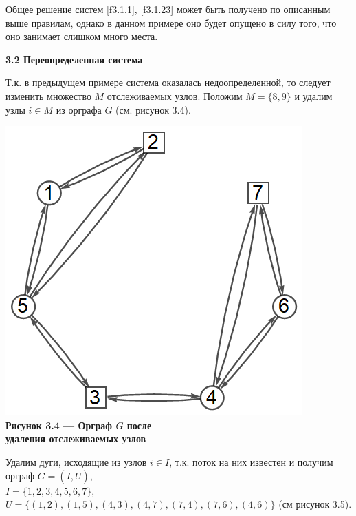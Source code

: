 \documentclass[14pt]{extarticle}%
\begin{document}
Общее решение систем \eqref{f3.1.1}, \eqref{f3.1.23} может быть получено по описанным выше правилам, однако в данном примере оно будет опущено в силу того, что оно занимает слишком много места.


\textbf{3.2 Переопределенная система}

Т.к. в предыдущем примере система оказалась недоопределенной, то следует изменить множество $M$ отслеживаемых узлов. Положим $M=\{8,9\}$ и удалим узлы $i\in M$ из орграфа $G$ (см. рисунок 3.4).

\begin{center}
\includegraphics[scale=0.5]{grs/s2g1.png}\\
\textbf{Рисунок 3.4 --- Орграф $G$ после \\удаления отслеживаемых узлов}
\end{center}

Удалим дуги, исходящие из узлов $i\in \overline{I}$, т.к. поток на них известен и получим орграф $\overline{G}=(\overline{I},\overline{U})$,\\ $\overline{I}=\{1,2,3,4,5,6,7\}$,\\ $\overline{U}=\{(1 , 2), (1 , 5), (4 , 3),  (4 , 7), (7 , 4), (7 , 6),  (4 , 6)\}$ (см рисунок 3.5).
\end{document}
